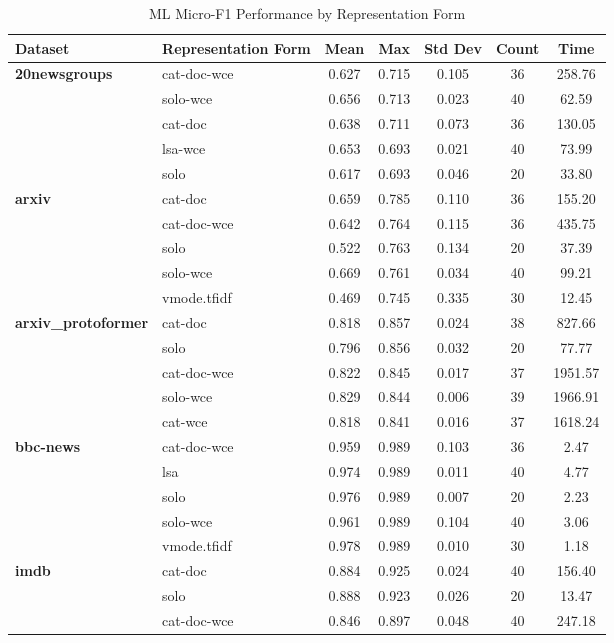 \documentclass[final]{clv2025}
\begin{document}
\begin{table}[h!]
\centering
\scriptsize
\caption{ML Micro-F1 Performance by Representation Form}
\label{tab:micro_f1_repr_form}
\begin{tabular}{@{}p{2.2cm} p{2.6cm} c c c c c@{}}
\toprule
\textbf{Dataset} & \textbf{Representation Form} & \textbf{Mean} & \textbf{Max} & \textbf{Std Dev} & \textbf{Count} & \textbf{Time} \\
\midrule
\textbf{20newsgroups} & cat-doc-wce & 0.627 & 0.715 & 0.105 & 36 & 258.76 \\
 & solo-wce & 0.656 & 0.713 & 0.023 & 40 & 62.59 \\
 & cat-doc & 0.638 & 0.711 & 0.073 & 36 & 130.05 \\
 & lsa-wce & 0.653 & 0.693 & 0.021 & 40 & 73.99 \\
 & solo & 0.617 & 0.693 & 0.046 & 20 & 33.80 \\
\midrule
\textbf{arxiv} & cat-doc & 0.659 & 0.785 & 0.110 & 36 & 155.20 \\
 & cat-doc-wce & 0.642 & 0.764 & 0.115 & 36 & 435.75 \\
 & solo & 0.522 & 0.763 & 0.134 & 20 & 37.39 \\
 & solo-wce & 0.669 & 0.761 & 0.034 & 40 & 99.21 \\
 & vmode.tfidf & 0.469 & 0.745 & 0.335 & 30 & 12.45 \\
\midrule
\textbf{arxiv\_protoformer} & cat-doc & 0.818 & 0.857 & 0.024 & 38 & 827.66 \\
 & solo & 0.796 & 0.856 & 0.032 & 20 & 77.77 \\
 & cat-doc-wce & 0.822 & 0.845 & 0.017 & 37 & 1951.57 \\
 & solo-wce & 0.829 & 0.844 & 0.006 & 39 & 1966.91 \\
 & cat-wce & 0.818 & 0.841 & 0.016 & 37 & 1618.24 \\
\midrule
\textbf{bbc-news} & cat-doc-wce & 0.959 & 0.989 & 0.103 & 36 & 2.47 \\
 & lsa & 0.974 & 0.989 & 0.011 & 40 & 4.77 \\
 & solo & 0.976 & 0.989 & 0.007 & 20 & 2.23 \\
 & solo-wce & 0.961 & 0.989 & 0.104 & 40 & 3.06 \\
 & vmode.tfidf & 0.978 & 0.989 & 0.010 & 30 & 1.18 \\
\midrule
\textbf{imdb} & cat-doc & 0.884 & 0.925 & 0.024 & 40 & 156.40 \\
 & solo & 0.888 & 0.923 & 0.026 & 20 & 13.47 \\
 & cat-doc-wce & 0.846 & 0.897 & 0.048 & 40 & 247.18 \\

\end{tabular}
\end{table}
\end{document}
